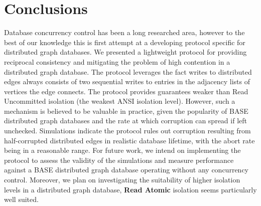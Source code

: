 \section{Conclusions}

Database concurrency control has been a long researched area, however to the best of our knowledge this is first attempt at a developing protocol specific for distributed graph databases. We presented a lightweight protocol for providing reciprocal consistency and mitigating the problem of high contention in a distributed graph database. The \tDelta protocol leverages the fact writes to distributed edges always consists of two sequential writes to entries in the adjacency lists of vertices the edge connects. The protocol provides guarantees weaker than Read Uncommitted isolation (the weakest ANSI isolation level). However, such a mechanism is believed to be valuable in practice, given the popularity of BASE distributed graph databases and the rate at which corruption can spread if left unchecked. Simulations indicate the protocol rules out corruption resulting from half-corrupted distributed edges in realistic database lifetime, with the abort rate being in a reasonable range. For future work, we intend on implementing the protocol to assess the validity of the simulations and measure performance against a BASE distributed graph database operating without any concurrency control. Moreover, we plan on investigating the suitability of higher isolation levels in a distributed graph database, \textbf{Read Atomic} isolation \cite{Bailis2014} seems particularly well suited.
